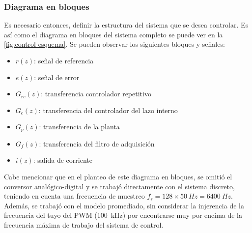 \documentclass[../et.tex]{subfiles}
\begin{document}
  \subsubsection{Diagrama en bloques}
  Es necesario entonces, definir la estructura del sistema que se desea controlar. Es así como el diagrama en bloques del sistema completo se puede ver en la \autoref{fig:control-esquema}. Se pueden observar los siguientes bloques y señales:

  \begin{itemize}
    \item $r(z)$: señal de referencia
    \item $e(z)$: señal de error
    \item $G_{rc}(z)$: transferencia controlador repetitivo
    \item $G_c(z)$: transferencia del controlador del lazo interno
    \item $G_p(z)$: transferencia de la planta
    \item $G_f(z)$: transferencia del filtro de adquisición
    \item $i(z)$: salida de corriente
  \end{itemize}

  Cabe mencionar que en el planteo de este diagrama en bloques, se omitió el conversor analógico-digital y se trabajó directamente con el sistema discreto, teniendo en cuenta una frecuencia de muestreo $f_s = 128 \times \SI{50}{Hz} = \SI{6400}{Hz}$. Además, se trabajó con el modelo promediado, sin considerar la injerencia de la frecuencia del tuyo del PWM (\SI{100}{kHz}) por encontrarse muy por encima de la frecuencia máxima de trabajo del sistema de control.
\end{document}
